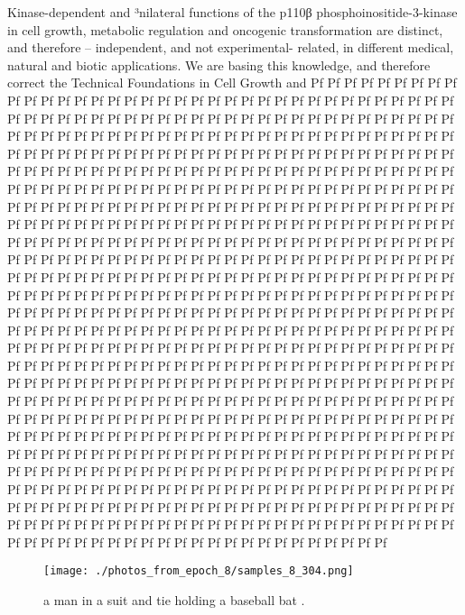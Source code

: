 \documentclass{article}%
\begin{document}
Kinase{-}dependent and ³nilateral functions of the p110β phosphoinositide{-}3{-}kinase in cell growth, metabolic regulation and oncogenic transformation are distinct, and therefore – independent, and not experimental{-} related, in different medical, natural and biotic applications. We are basing this knowledge, and therefore correct the Technical Foundations in Cell Growth and Pf Pf Pf Pf Pf Pf Pf Pf Pf Pf Pf Pf Pf Pf Pf Pf Pf Pf Pf Pf Pf Pf Pf Pf Pf Pf Pf Pf Pf Pf Pf Pf Pf Pf Pf Pf Pf Pf Pf Pf Pf Pf Pf Pf Pf Pf Pf Pf Pf Pf Pf Pf Pf Pf Pf Pf Pf Pf Pf Pf Pf Pf Pf Pf Pf Pf Pf Pf Pf Pf Pf Pf Pf Pf Pf Pf Pf Pf Pf Pf Pf Pf Pf Pf Pf Pf Pf Pf Pf Pf Pf Pf Pf Pf Pf Pf Pf Pf Pf Pf Pf Pf Pf Pf Pf Pf Pf Pf Pf Pf Pf Pf Pf Pf Pf Pf Pf Pf Pf Pf Pf Pf Pf Pf Pf Pf Pf Pf Pf Pf Pf Pf Pf Pf Pf Pf Pf Pf Pf Pf Pf Pf Pf Pf Pf Pf Pf Pf Pf Pf Pf Pf Pf Pf Pf Pf Pf Pf Pf Pf Pf Pf Pf Pf Pf Pf Pf Pf Pf Pf Pf Pf Pf Pf Pf Pf Pf Pf Pf Pf Pf Pf Pf Pf Pf Pf Pf Pf Pf Pf Pf Pf Pf Pf Pf Pf Pf Pf Pf Pf Pf Pf Pf Pf Pf Pf Pf Pf Pf Pf Pf Pf Pf Pf Pf Pf Pf Pf Pf Pf Pf Pf Pf Pf Pf Pf Pf Pf Pf Pf Pf Pf Pf Pf Pf Pf Pf Pf Pf Pf Pf Pf Pf Pf Pf Pf Pf Pf Pf Pf Pf Pf Pf Pf Pf Pf Pf Pf Pf Pf Pf Pf Pf Pf Pf Pf Pf Pf Pf Pf Pf Pf Pf Pf Pf Pf Pf Pf Pf Pf Pf Pf Pf Pf Pf Pf Pf Pf Pf Pf Pf Pf Pf Pf Pf Pf Pf Pf Pf Pf Pf Pf Pf Pf Pf Pf Pf Pf Pf Pf Pf Pf Pf Pf Pf Pf Pf Pf Pf Pf Pf Pf Pf Pf Pf Pf Pf Pf Pf Pf Pf Pf Pf Pf Pf Pf Pf Pf Pf Pf Pf Pf Pf Pf Pf Pf Pf Pf Pf Pf Pf Pf Pf Pf Pf Pf Pf Pf Pf Pf Pf Pf Pf Pf Pf Pf Pf Pf Pf Pf Pf Pf Pf Pf Pf Pf Pf Pf Pf Pf Pf Pf Pf Pf Pf Pf Pf Pf Pf Pf Pf Pf Pf Pf Pf Pf Pf Pf Pf Pf Pf Pf Pf Pf Pf Pf Pf Pf Pf Pf Pf Pf Pf Pf Pf Pf Pf Pf Pf Pf Pf Pf Pf Pf Pf Pf Pf Pf Pf Pf Pf Pf Pf Pf Pf Pf Pf Pf Pf Pf Pf Pf Pf Pf Pf Pf Pf Pf Pf Pf Pf Pf Pf Pf Pf Pf Pf Pf Pf Pf Pf Pf Pf Pf Pf Pf Pf Pf Pf Pf Pf Pf Pf Pf Pf Pf Pf Pf Pf Pf Pf Pf Pf Pf Pf Pf Pf Pf Pf Pf Pf Pf Pf Pf Pf Pf Pf Pf Pf Pf Pf Pf Pf Pf Pf Pf Pf Pf Pf Pf Pf Pf Pf Pf Pf Pf Pf Pf Pf Pf Pf Pf Pf Pf Pf Pf Pf Pf Pf Pf Pf Pf Pf Pf Pf Pf Pf Pf Pf Pf Pf Pf Pf Pf Pf Pf Pf Pf Pf Pf Pf Pf Pf Pf Pf Pf Pf Pf Pf Pf Pf Pf Pf Pf Pf Pf Pf Pf Pf Pf Pf Pf Pf Pf Pf Pf Pf Pf Pf Pf Pf Pf Pf Pf Pf Pf Pf Pf Pf Pf Pf Pf Pf Pf Pf Pf Pf Pf Pf Pf Pf Pf Pf Pf Pf Pf Pf Pf Pf Pf Pf Pf Pf Pf Pf Pf Pf Pf Pf Pf Pf Pf Pf Pf Pf Pf Pf Pf Pf Pf Pf Pf Pf Pf Pf Pf Pf Pf Pf Pf Pf Pf Pf Pf Pf Pf Pf Pf Pf Pf Pf Pf Pf Pf Pf Pf Pf Pf Pf Pf Pf Pf Pf Pf Pf Pf Pf Pf Pf Pf Pf Pf Pf Pf Pf Pf Pf Pf Pf Pf Pf Pf Pf Pf Pf Pf Pf Pf Pf Pf Pf Pf Pf Pf Pf Pf Pf Pf Pf Pf Pf Pf Pf Pf Pf Pf Pf\newline%

%


\begin{figure}[h!]%
\centering%
\texttt{[image: ./photos\_from\_epoch\_8/samples\_8\_304.png]}%
\caption{a man in a suit and tie holding a baseball bat .}%
\end{figure}

%
\end{document}
